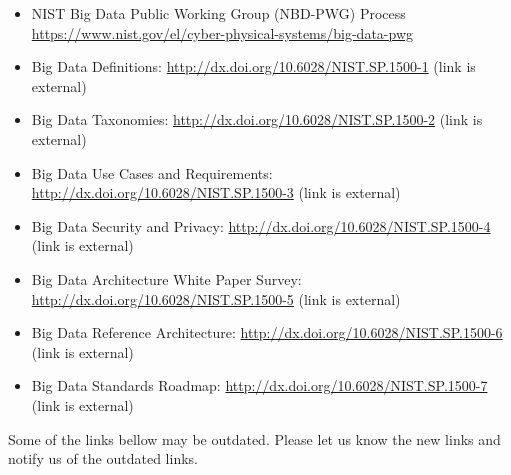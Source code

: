 \begin{itemize}
\item
  NIST Big Data Public Working Group (NBD-PWG) Process
  \url{https://www.nist.gov/el/cyber-physical-systems/big-data-pwg}
\item
  Big Data Definitions: \url{http://dx.doi.org/10.6028/NIST.SP.1500-1}
  (link is external)
\item
  Big Data Taxonomies: \url{http://dx.doi.org/10.6028/NIST.SP.1500-2}
  (link is external)
\item
  Big Data Use Cases and Requirements:
  \url{http://dx.doi.org/10.6028/NIST.SP.1500-3} (link is external)
\item
  Big Data Security and Privacy:
  \url{http://dx.doi.org/10.6028/NIST.SP.1500-4} (link is external)
\item
  Big Data Architecture White Paper Survey:
  \url{http://dx.doi.org/10.6028/NIST.SP.1500-5} (link is external)
\item
  Big Data Reference Architecture:
  \url{http://dx.doi.org/10.6028/NIST.SP.1500-6} (link is external)
\item
  Big Data Standards Roadmap:
  \url{http://dx.doi.org/10.6028/NIST.SP.1500-7} (link is external)
\end{itemize}

Some of the links bellow may be outdated. Please let us know the new
links and notify us of the outdated links.



